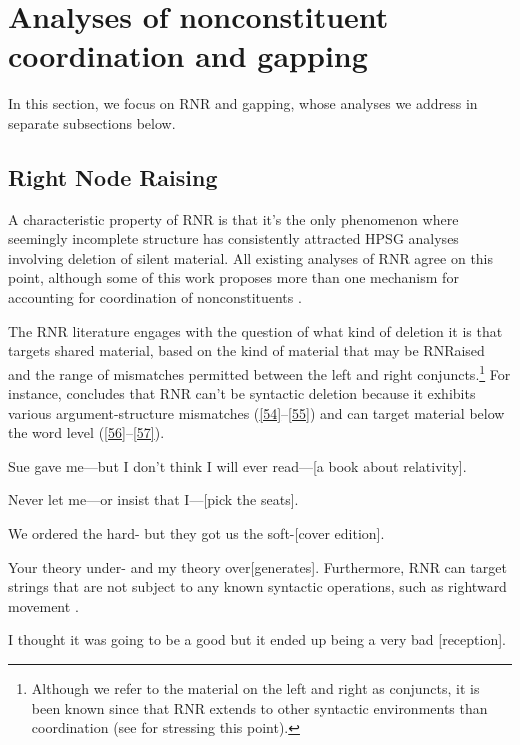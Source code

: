 \documentclass[output=paper
                ,modfonts
                ,nonflat
	        ,collection
	        ,collectionchapter
	        ,collectiontoclongg
 	        ,biblatex
                ,babelshorthands
                ,newtxmath
                ,draftmode
                ,colorlinks, citecolor=brown
]{./langsci/langscibook}
\begin{document}
{\section{Analyses of nonconstituent coordination and gapping}
In this section, we focus on RNR and gapping, whose analyses we address in separate subsections below.

\subsection{Right Node Raising}
A characteristic property of RNR is that it's the only phenomenon where seemingly incomplete structure has consistently attracted HPSG analyses involving deletion of silent material. All existing analyses of RNR \citep{Abeille2016, Beavers2004, Chaves2008, Chavez2014, Crysmann2003, Yatabe2001, Yatabe2012} agree on this point, although some of this work proposes more than one mechanism for accounting for coordination of nonconstituents \citep{Chaves2014, Yatabe2001, Yatabe2012, Yatabe2018}.

The RNR literature engages with the question of what kind of deletion it is that targets shared material, based on the kind of material that may be RNRaised and the range of mismatches permitted between the left and right conjuncts.\footnote{Although we refer to the material on the left and right as conjuncts, it is been known since \citet{Hudson1976, Hudson1984} that RNR extends to other syntactic environments than coordination (see \citealt{Chaves2014} for stressing this point).} For instance, \citet[839--840]{Chaves2014} concludes that RNR can't be syntactic deletion because it exhibits various argument-structure mismatches (\ref{54}--\ref{55}) and can target material below the word level (\ref{56}--\ref{57}).


\ea Sue gave me---but I don't think I will ever read---[a book about relativity]. \label{54}\z

\ea Never let me---or insist that I---[pick the seats].\label{55}\z

\ea We ordered the hard- but they got us the soft-[cover edition].\label{56}\z

\ea Your theory under- and my theory over[generates].\label{57}\z
Furthermore, RNR can target strings that are not subject to any known syntactic operations, such as rightward movement \citep[865]{Chaves2014}.

\ea I thought it was going to be a good but it ended up being a very bad [reception].\label{58}\z

}
\end{document}

